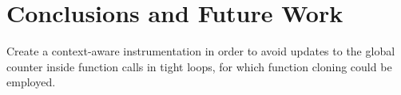 \chapter{Conclusions and Future Work}

Create a context-aware instrumentation in order to avoid updates to the global counter inside function calls in tight loops, for which function cloning could be employed.
